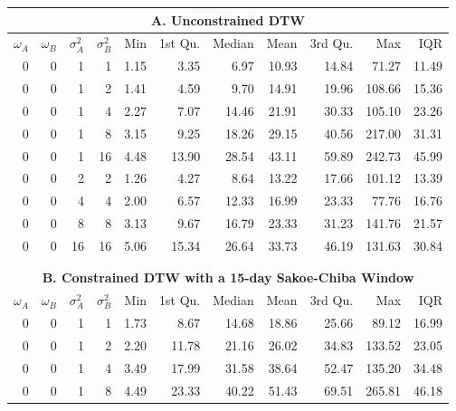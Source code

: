 \documentclass[12pt]{report}
\begin{document}
\begin{table}[!ht]
    \fontsize{10pt}{10pt}\selectfont
    \begin{center}
      \begin{tabular}{r r r r | r r r r r r r}
        \multicolumn{11}{c}{\textbf{A. Unconstrained DTW}} \\
        \midrule
        $\omega_{A}$ & $\omega_{B}$ & $\sigma^{2}_{A}$ & $\sigma^{2}_{B}$ & Min & 1st Qu. & Median & Mean & 3rd Qu. & Max & IQR \\
        \midrule
        0 & 0 & 1  & 1  & 1.15 &  3.35 &  6.97 & 10.93 & 14.84 &  71.27 & 11.49  \\
        \midrule
        0 & 0 & 1  & 2  & 1.41 &  4.59 &  9.70 & 14.91 & 19.96 & 108.66 & 15.36  \\
        0 & 0 & 1  & 4  & 2.27 &  7.07 & 14.46 & 21.91 & 30.33 & 105.10 & 23.26  \\
        0 & 0 & 1  & 8  & 3.15 &  9.25 & 18.26 & 29.15 & 40.56 & 217.00 & 31.31  \\
        0 & 0 & 1  & 16 & 4.48 & 13.90 & 28.54 & 43.11 & 59.89 & 242.73 & 45.99  \\
        \midrule
        0 & 0 & 2  & 2  & 1.26 &  4.27 &  8.64 & 13.22 & 17.66 & 101.12 & 13.39  \\
        0 & 0 & 4  & 4  & 2.00 &  6.57 & 12.33 & 16.99 & 23.33 &  77.76 & 16.76  \\
        0 & 0 & 8  & 8  & 3.13 &  9.67 & 16.79 & 23.33 & 31.23 & 141.76 & 21.57  \\
        0 & 0 & 16 & 16 & 5.06 & 15.34 & 26.64 & 33.73 & 46.19 & 131.63 & 30.84  \\
        \hline
        \\
        \\
        \multicolumn{11}{c}{\textbf{B. Constrained DTW with a 15-day Sakoe-Chiba Window}} \\
        \midrule
        $\omega_{A}$ & $\omega_{B}$ & $\sigma^{2}_{A}$ & $\sigma^{2}_{B}$ & Min & 1st Qu. & Median & Mean & 3rd Qu. & Max & IQR \\
        \midrule
        0 & 0 & 1  & 1  & 1.73 & 8.67 & 14.68 & 18.86 &  25.66 &  89.12 & 16.99  \\
        \midrule
        0 & 0 & 1  & 2  & 2.20 & 11.78 & 21.16 & 26.02 &  34.83 & 133.52 & 23.05  \\
        0 & 0 & 1  & 4  & 3.49 & 17.99 & 31.58 & 38.64 &  52.47 & 135.20 & 34.48  \\
        0 & 0 & 1  & 8  & 4.49 & 23.33 & 40.22 & 51.43 &  69.51 & 265.81 & 46.18  \\

\end{tabular}
\end{center}
\end{table}
\end{document}

